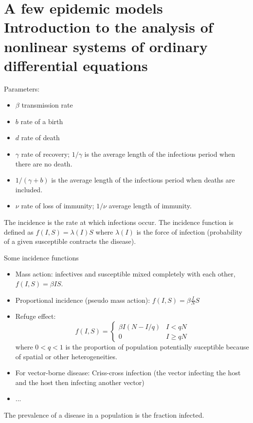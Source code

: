 \chapter[Epidemic models]{A few epidemic models\vskip1cm Introduction to the analysis of nonlinear systems of ordinary differential equations}
\label{chap:epidemic_models}



Parameters:
\begin{itemize}
\item $\beta$ transmission rate
\item $b$ rate of a birth
\item $d$ rate of death 
\item $\gamma$ rate of recovery; $1/\gamma $ is the average length of the infectious period when there are no death.
\item $1/(\gamma +b)$ is the average length of the infectious period when deaths are included.
\item $\nu$ rate of loss of immunity; $1/\nu$ average length of immunity.
\end{itemize}

\begin{definition}
The incidence is the rate at which infections occur. The incidence function is defined as $f(I,S)=\lambda(I)S$ where $\lambda(I)$ is the force of infection (probability of a given susceptible contracts the disease).
\end{definition}
Some incidence functions
\begin{itemize}
\item Mass action: infectives and susceptible mixed completely with each other, $f(I,S)=\beta IS$.
\item Proportional incidence (pseudo mass action): $f(I,S)=\beta \frac{I}{N}S$
\item Refuge effect: $$f(I,S)=\left \{\begin{array}{cc}\beta I (N-I/q)& I <qN\\
0 & I\geq qN\end{array}\right .$$
where $0<q<1$ is the proportion of population potentially suceptible because of spatial or other heterogeneities.
\item For vector-borne disease: Criss-cross infection (the vector infecting the host and the host then infecting another vector)
\item ...
\end{itemize}

\begin{definition}
The prevalence of a disease in a population is the fraction infected.
\end{definition}

